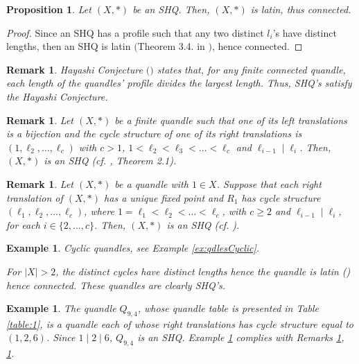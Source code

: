 \documentclass{article}
\newtheorem{proposition}[theorem]{Proposition}
\newtheorem{remark}[theorem]{Remark}
\newtheorem{example}[theorem]{Example}
\begin{document}
\begin{proposition}\label{prop:latin}
Let $(X,*)$ be an SHQ. Then,  $(X,*)$ is latin, thus connected.
\end{proposition}
\begin{proof}
Since an SHQ has a profile such that any two distinct $l_i$'s have distinct lengths, then an SHQ is latin $($Theorem 3.4. in \cite{Lages_Lopes_Vojtěchovský}$)$, hence connected.
\end{proof}

\begin{remark}\label{rmk:Hayashi}
Hayashi Conjecture $($\cite{Hayashi}$)$ states that, for any finite connected quandle, each length of the quandles' profile divides the largest length. Thus, SHQ's satisfy the Hayashi Conjecture.
\end{remark}

\begin{remark}\label{rmk:Lopes+Singh}
Let $(X, *)$ be a finite quandle such that one of its left translations is a bijection and the cycle structure of one of its right translations is $(1, \ell_2, \dots , \ell_c)$ with $c>1$, $1<\ell_2<\ell_3< \dots < \ell_c$ and $\ell_{i-1}\mid \ell_i$. Then, $(X, *)$ is an SHQ (cf. \cite{Lopes_Singh}, Theorem 2.1).
\end{remark}

\begin{remark}\label{rmk:nested}
Let $(X,*)$ be a quandle with $1\in X$. Suppose that each right translation of $(X,*)$ has a unique fixed point and $R_1$ has cycle structure $(\ell_1,\ell_2,\dots,\ell_c)$, where $1=\ell_1<\ell_2<\dots<\ell_c$, with $c\geq2$ and $\ell_{i-1}\mid\ell_i$, for each $i\in\{2,\dots,c\}$. Then, $(X,*)$ is an SHQ (cf. \cite{Lages_Lopes_Vojtěchovský}).
\end{remark}

\begin{example}\label{example:cyclic}
Cyclic quandles, see Example \ref{ex:qdlesCyclic}.


For $|X|>2$, the distinct cycles have distinct lengths hence the quandle is latin (\cite{Lages_Lopes_Vojtěchovský}) hence connected.  These quandles are clearly SHQ's.
\end{example}


\begin{example}\label{example:1}
The quandle $Q_{9,4}$, whose quandle table is presented in Table \ref{table:1}, is a quandle each of whose right translations has cycle structure equal to $(1,2,6)$. Since $1\mid2\mid6$, $Q_{9,4}$ is an SHQ. Example \ref{example:1} complies with Remarks  \ref{rmk:Lopes+Singh}, \ref{rmk:nested}.
\end{example}
\end{document}
